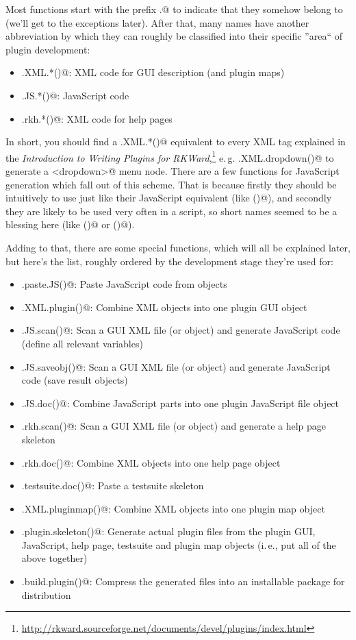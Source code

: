 \documentclass[a4paper,10pt]{scrartcl}
\begin{document}
Most functions start with the prefix \verb@rk.@ to indicate that they somehow belong to \verb@RKWard@
(we'll get to the exceptions later). After that, many names have another abbreviation by which they can
roughly be classified into their specific ''area`` of plugin development:

\begin{itemize}
	\item \verb@rk.XML.*()@: XML code for GUI description (and plugin maps)
	\item \verb@rk.JS.*()@: JavaScript code
	\item \verb@rk.rkh.*()@: XML code for help pages
\end{itemize}

In short, you should find a \verb@rk.XML.*()@ equivalent to every XML tag explained in the
\textit{Introduction to Writing Plugins for
RKWard},\footnote{\url{http://rkward.sourceforge.net/documents/devel/plugins/index.html}}
e.\,g. \verb@rk.XML.dropdown()@ to generate a \verb@<dropdown>@ menu node. There are a few functions for
JavaScript generation which fall out of this scheme. That is because firstly they should be intuitively to use
just like their JavaScript equivalent (like \verb@echo()@), and secondly they are likely to be used very often
in a script, so short names seemed to be a blessing here (like \verb@id()@ or \verb@qp()@).

Adding to that, there are some special functions, which will all be explained later, but here's the list,
roughly ordered by the development stage they're used for:

\begin{itemize}
	\item \verb@rk.paste.JS()@: Paste JavaScript code from \verb@R@ objects
	\item \verb@rk.XML.plugin()@: Combine XML objects into one plugin GUI object
	\item \verb@rk.JS.scan()@: Scan a GUI XML file (or \verb@R@ object) and generate JavaScript code
		(define all relevant variables)
	\item \verb@rk.JS.saveobj()@: Scan a GUI XML file (or \verb@R@ object) and generate JavaScript code
		(save result objects)
	\item \verb@rk.JS.doc()@: Combine JavaScript parts into one plugin JavaScript file object
	\item \verb@rk.rkh.scan()@: Scan a GUI XML file (or \verb@R@ object) and generate a help page skeleton
	\item \verb@rk.rkh.doc()@: Combine XML objects into one help page object
	\item \verb@rk.testsuite.doc()@: Paste a testsuite skeleton
	\item \verb@rk.XML.pluginmap()@: Combine XML objects into one plugin map object
	\item \verb@rk.plugin.skeleton()@: Generate actual plugin files from the plugin GUI, JavaScript, help page,
		testsuite and plugin map objects (i.\,e., put all of the above together)
	\item \verb@rk.build.plugin()@: Compress the generated files into an installable \verb@R@ package for
		distribution
\end{itemize}
\end{document}
